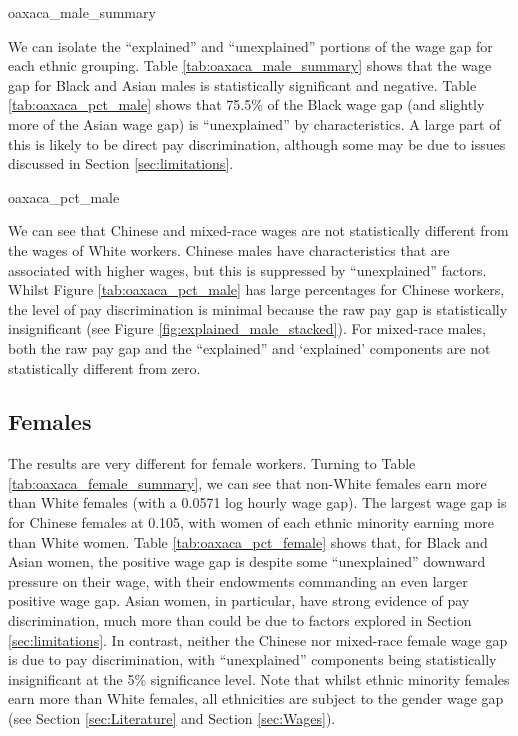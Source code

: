 \documentclass[class=article, crop=false]{standalone}
\begin{document}
{oaxaca_male_summary}
\doublespacing

We can isolate the \enquote{explained} and \enquote{unexplained} portions of the wage gap for each ethnic grouping. Table \ref{tab:oaxaca_male_summary} shows that the wage gap for Black and Asian males is statistically significant and negative. Table \ref{tab:oaxaca_pct_male} shows that 75.5\% of the Black wage gap (and slightly more of the Asian wage gap) is \enquote{unexplained} by characteristics. A large part of this is likely to be direct pay discrimination, although some may be due to issues discussed in Section \ref{sec:limitations}.

{oaxaca_pct_male}
\doublespacing

We can see that Chinese and mixed-race wages are not statistically different from the wages of White workers. Chinese males have characteristics that are associated with higher wages, but this is suppressed by \enquote{unexplained} factors. Whilst Figure \ref{tab:oaxaca_pct_male} has large percentages for Chinese workers, the level of pay discrimination is minimal because the raw pay gap is statistically insignificant (see Figure \ref{fig:explained_male_stacked}). For mixed-race males, both the raw pay gap and the \enquote{explained} and \enquote*{explained} components are not statistically different from zero.

\subsection{Females}
\label{sec:Females}
The results are very different for female workers. Turning to Table \ref{tab:oaxaca_female_summary}, we can see that non-White females earn more than White females (with a 0.0571 log hourly wage gap). The largest wage gap is for Chinese females at 0.105, with women of each ethnic minority earning more than White women. Table \ref{tab:oaxaca_pct_female} shows that, for Black and Asian women, the positive wage gap is despite some \enquote{unexplained} downward pressure on their wage, with their endowments commanding an even larger positive wage gap. Asian women, in particular, have strong evidence of pay discrimination, much more than could be due to factors explored in Section \ref{sec:limitations}. In contrast, neither the Chinese nor mixed-race female wage gap is due to pay discrimination, with \enquote{unexplained} components being statistically insignificant at the 5\% significance level. Note that whilst ethnic minority females earn more than White females, all ethnicities are subject to the gender wage gap (see Section \ref{sec:Literature} and Section \ref{sec:Wages}).
\end{document}
